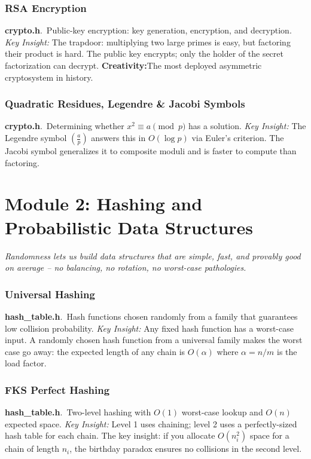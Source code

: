 \documentclass[11pt,a4paper]{article}
\newcommand{\algo}[2]{\textbf{#1}.\ #2}
\newcommand{\insight}{\textit{Key Insight: }}
\newcommand{\creative}{\textcolor{orange!80!black}{\textbf{Creativity:}}}
\begin{document}
\subsubsection{RSA Encryption}
\algo{crypto.h}{Public-key encryption: key generation, encryption, and decryption.}
\insight The trapdoor: multiplying two large primes is easy, but factoring their product is hard. The public key encrypts; only the holder of the secret factorization can decrypt.
\creative The most deployed asymmetric cryptosystem in history.

\subsubsection{Quadratic Residues, Legendre \& Jacobi Symbols}
\algo{crypto.h}{Determining whether \(x^2 \equiv a \pmod{p}\) has a solution.}
\insight The Legendre symbol \(\left(\frac{a}{p}\right)\) answers this in \(O(\log p)\) via Euler's criterion. The Jacobi symbol generalizes it to composite moduli and is faster to compute than factoring.

\section{Module 2: Hashing and Probabilistic Data Structures}
\label{sec:data}

\textit{Randomness lets us build data structures that are simple, fast, and provably good on average -- no balancing, no rotation, no worst-case pathologies.}

\subsubsection{Universal Hashing}
\algo{hash\_table.h}{Hash functions chosen randomly from a family that guarantees low collision probability.}
\insight Any fixed hash function has a worst-case input. A randomly chosen hash function from a universal family makes the worst case go away: the expected length of any chain is \(O(\alpha)\) where \(\alpha = n/m\) is the load factor.

\subsubsection{FKS Perfect Hashing}
\algo{hash\_table.h}{Two-level hashing with \(O(1)\) worst-case lookup and \(O(n)\) expected space.}
\insight Level 1 uses chaining; level 2 uses a perfectly-sized hash table for each chain. The key insight: if you allocate \(O(n_i^2)\) space for a chain of length \(n_i\), the birthday paradox ensures no collisions in the second level.
\end{document}

